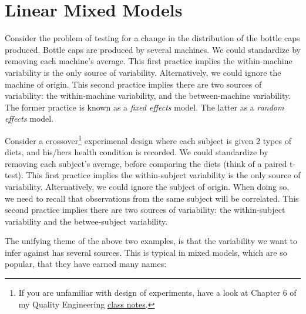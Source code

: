 \documentclass[]{book}
\theoremstyle{definition}
\theoremstyle{definition}
\theoremstyle{remark}
\let\BeginKnitrBlock\begin \let\EndKnitrBlock\end
\begin{document}
\chapter{Linear Mixed Models}\label{lme}

\BeginKnitrBlock{example}
\protect\hypertarget{ex:fixed-effects}{}{\label{ex:fixed-effects}}Consider
the problem of testing for a change in the distribution of the bottle
caps produced. Bottle caps are produced by several machines. We could
standardize by removing each machine's average. This first practice
implies the within-machine variability is the only source of
variability. Alternatively, we could ignore the machine of origin. This
second practice implies there are two sources of variability: the
within-machine variability, and the between-machine variability. The
former practice is known as a \emph{fixed effects} model. The latter as
a \emph{random effects} model.
\EndKnitrBlock{example}

\BeginKnitrBlock{example}
\protect\hypertarget{ex:random-effects}{}{\label{ex:random-effects}}Consider
a crossover\footnote{If you are unfamiliar with design of experiments,
  have a look at Chapter 6 of my Quality Engineering
  \href{https://github.com/johnros/qualityEngineering/blob/master/Class_notes/notes.pdf}{class
  notes}.} experimenal design where each subject is given 2 types of
diets, and his/hers health condition is recorded. We could standardize
by removing each subject's average, before comparing the diets (think of
a paired t-test). This first practice implies the within-subject
variability is the only source of variability. Alternatively, we could
ignore the subject of origin. When doing so, we need to recall that
observations from the same subject will be correlated. This second
practice implies there are two sources of variability: the
within-subject variability and the betwee-subject variability.
\EndKnitrBlock{example}

The unifying theme of the above two examples, is that the variability we
want to infer against has several sources. This is typical in mixed
models, which are so popular, that they have earned many names:
\end{document}
